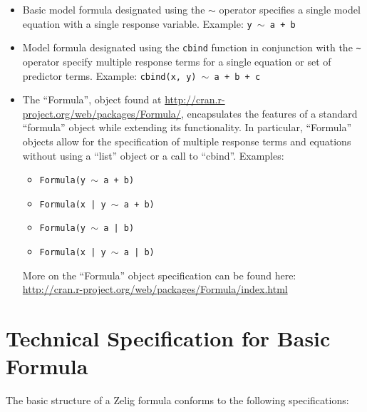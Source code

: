 \documentclass{article}
\newcommand{\tweedly}[0]{$\sim${ }}
\begin{document}
\begin{itemize}

  \item Basic model formula designated using the \tweedly operator specifies a single
    model equation with a single response variable. Example: 
    {\tt y \tweedly a + b}

  \item Model formula designated using the \verb+cbind+ function in conjunction
    with the \verb+~+ operator specify multiple response terms for a single
    equation or set of predictor terms. Example: 
    {\tt cbind(x, y) \tweedly a + b + c}

  \item The ``Formula'', object found at
    \url{http://cran.r-project.org/web/packages/Formula/}, encapsulates the
    features of a standard ``formula'' object while extending its functionality.
    In particular, ``Formula'' objects allow for the specification of multiple
    response terms and equations without using a ``list'' object or a call to
    ``cbind''. Examples:
    \begin{itemize}
      \item {\tt Formula(y \tweedly a + b)}
      \item {\tt Formula(x | y \tweedly a + b)}
      \item {\tt Formula(y \tweedly a | b)}
      \item {\tt Formula(x | y \tweedly a | b)}
   \end{itemize}

   More on the ``Formula'' object specification can be found here:\\
   \url{http://cran.r-project.org/web/packages/Formula/index.html}

\end{itemize}





\section{Technical Specification for Basic Formula}

The basic structure of a Zelig formula conforms to the following specifications:
\end{document}
